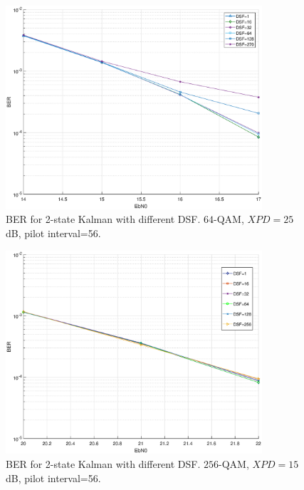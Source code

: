 \begin{figure}
	\includegraphics[width=0.85\textwidth]{figures/fig_red_kalman/xpic_xpd_25_qam_64_bis.eps}
	\caption{BER for 2-state Kalman with different DSF. $64$-QAM, $XPD=25$ dB, pilot interval=56.}
	\label{fig13}      
\end{figure}

\begin{figure}
	\includegraphics[width=0.85\textwidth]{figures/fig_red_kalman/xpic_xpd_15_qam_256_bis.eps}
	\caption{BER for 2-state Kalman with different DSF. $256$-QAM, $XPD=15$ dB, pilot interval=56.}
	\label{fig14}      
\end{figure}

